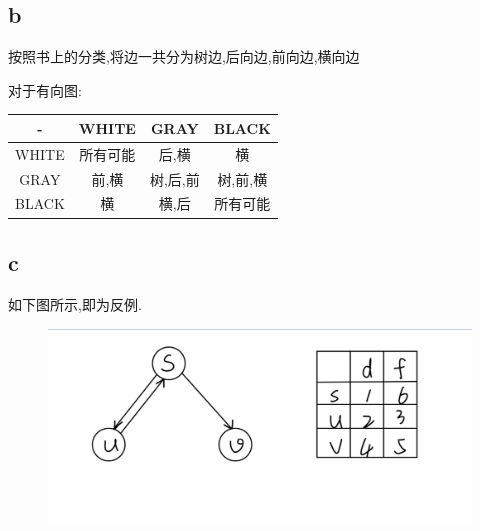 \documentclass[12pt,a4paper,fontset=none]{ctexart}
\begin{document}
\subsection{b}
按照书上的分类,将边一共分为树边,后向边,前向边,横向边

对于有向图:
\begin{center}
    \begin{tabular}{|c|c|c|c|}
        \hline
        -     & WHITE    & GRAY     & BLACK    \\
        \hline
        WHITE & 所有可能 & 后,横    & 横       \\
        \hline
        GRAY  & 前,横    & 树,后,前 & 树,前,横 \\
        \hline
        BLACK & 横       & 横,后    & 所有可能 \\
        \hline
    \end{tabular}
\end{center}
\subsection{c}
如下图所示,即为反例.
\begin{figure}[H]
    \centering
    \includegraphics[width=0.7\linewidth]{习题2.png}
\end{figure}
\end{document}

